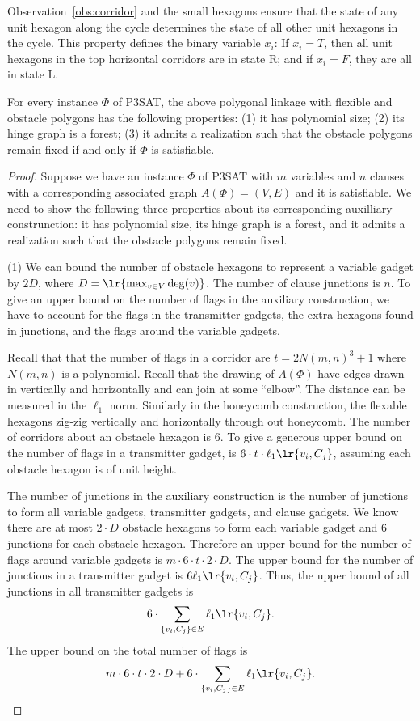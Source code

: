 Observation~\ref{obs:corridor} and the small hexagons ensure that the state of any unit hexagon along the cycle determines the state of all other unit hexagons in the cycle. 
This property defines the binary variable $x_i$: If $x_i=T$, then all unit hexagons in the top horizontal corridors are in state R; and if $x_i=F$, they are all in state L.

\begin{lem}\label{lem:aux}
For every instance $\Phi$ of P3SAT, the above polygonal linkage with flexible and obstacle polygons has the following properties: (1) it has polynomial size; (2) its hinge graph is a forest;
(3) it admits a realization such that the obstacle polygons remain fixed if and only if $\Phi$ is satisfiable.
\end{lem}
\begin{proof}

Suppose we have an instance $\Phi$ of P3SAT with $m$ variables and $n$ clauses with a corresponding associated graph $A(\Phi)=(V,E)$ and it is satisfiable.  
We need to show the following three properties about its corresponding auxilliary construnction: it has polynomial size, its hinge graph is a forest, and it admits a realization such that the obstacle polygons remain fixed.

\noindent (1) We can bound the number of obstacle hexagons to represent a variable gadget by $2 D$, where $D = \lr{ \max_{v \in V} \deg (v)}$.  
The number of clause junctions is $n$.
To give an upper bound on the number of flags in the auxiliary construction, we have to account for the flags in the transmitter gadgets, the extra hexagons found in junctions, and the flags around the variable gadgets.

Recall that that the number of flags in a corridor are $ t = 2N(m,n)^3 + 1 $ where $N(m,n)$ is a polynomial. 
Recall that the drawing of $A(\Phi)$ have edges drawn in vertically and horizontally and can join at some ``elbow''.  
The distance can be measured in the $\ell_1$ norm.
Similarly in the honeycomb construction, the flexable hexagons zig-zig vertically and horizontally through out honeycomb.  
The number of corridors about an obstacle hexagon is $6$.
To give a generous upper bound on the number of flags in a transmitter gadget, is $6 \cdot t \cdot \ell_1\lr{v_i,C_j}$, assuming each obstacle hexagon is of unit height.

The number of junctions in the auxiliary construction is the number of junctions to form all variable gadgets, transmitter gadgets, and clause gadgets. 
We know there are at most $2 \cdot D$ obstacle hexagons to form each variable gadget and $6$ junctions for each obstacle hexagon.  
Therefore an upper bound for the number of flags around variable gadgets is $m \cdot 6 \cdot t \cdot 2 \cdot D$.
The upper bound for the number of junctions in a transmitter gadget is $6 \ell_1 \lr{v_i, C_j}$.  
Thus, the upper bound of all junctions in all transmitter gadgets is $$6 \cdot \sum_{\left\lbrace v_i, C_j \right\rbrace \in E} \ell_1 \lr{v_i, C_j}.$$
The upper bound on the total number of flags is
$$m \cdot 6 \cdot t \cdot 2 \cdot D + 6 \cdot \sum_{\left\lbrace v_i, C_j \right\rbrace \in E} \ell_1 \lr{v_i, C_j}.$$


\end{proof}
